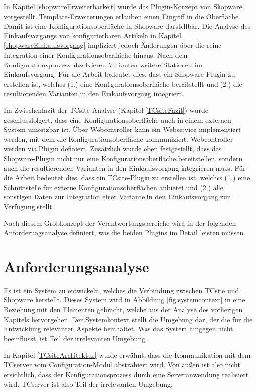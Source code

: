 \documentclass[11pt, a4paper, titlepage, listof=totoc, bibliography=totoc, index=totoc, twoside, openright, headings=normal]{scrreprt}
\begin{document}
In Kapitel \ref{shopwareErweiterbarkeit} wurde das Plugin-Konzept von Shopware vorgestellt. Template-Erweiterungen erlauben einen Eingriff in die Oberfläche. Damit ist eine Konfigurationsoberfläche in Shopware darstellbar. Die Analyse des Einkaufsvorgangs von konfigurierbaren Artikeln in Kapitel \ref{shopwareEinkaufsvorgang} impliziert jedoch Änderungen über die reine Integration einer Konfigurationsoberfläche hinaus. Nach dem Konfigurationsprozess absolvieren Varianten weitere Stationen im Einkaufsvorgang. Für die Arbeit bedeutet dies, dass ein Shopware-Plugin zu erstellen ist, welches (1.) eine Konfigurationsoberfläche bereitstellt und (2.) die resultierenden Varianten in den Einkaufsvorgang integriert.

Im Zwischenfazit der TCsite-Analyse (Kapitel \ref{TCsiteFazit}) wurde
geschlussfolgert, dass eine Konfigurationsoberfläche auch in einem externen System umsetzbar ist. Über Webcontroller kann ein Webservice implementiert werden, mit dem die Konfigurationsoberfläche kommuniziert. Webcontroller werden via Plugin definiert. Zusätzlich wurde oben festgestellt, dass das Shopware-Plugin nicht nur eine Konfigurationsoberfläche bereitstellen, sondern auch die resultierenden Varianten in den Einkaufsvorgang integrieren muss. Für die Arbeit bedeutet dies, dass ein TCsite-Plugin zu erstellen ist, welches (1.) eine Schnittstelle für externe Konfigurationsoberflächen anbietet und (2.) alle sonstigen Daten zur Integration einer Variante in den Einkaufsvorgang zur Verfügung stellt. 

Nach diesem Grobkonzept der Verantwortungsbereiche wird in der folgenden Anforderungsanalyse definiert, was die beiden Plugins im Detail leisten müssen.

\chapter{Anforderungsanalyse}
Es ist ein System zu entwickeln, welches die Verbindung zwischen TCsite und Shopware herstellt. Dieses System wird in Abbildung \ref{fig:systemcontext} in eine Beziehung mit den Elementen gebracht, welche aus der Analyse des vorherigen Kapitels hervorgehen. Der Systemkontext stellt die Umgebung dar, der die für die Entwicklung relevanten Aspekte beinhaltet. Was das System hingegen nicht beeinflusst, ist Teil der irrelevanten Umgebung.

In Kapitel \ref{TCsiteArchitektur} wurde erwähnt, dass die Kommunikation mit dem TCserver vom Configuration-Modul abstrahiert wird. Von außen ist also nicht ersichtlich, dass der Konfigurationsprozess durch eine Serveranwendung realisiert wird. TCserver ist also Teil der irrelevanten Umgebung.
\end{document}
